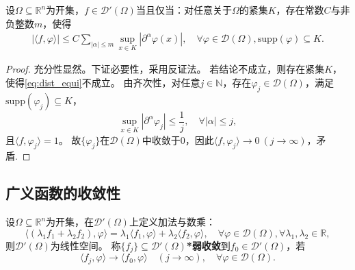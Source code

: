 \documentclass[../../main.tex]{subfiles}%
\begin{document}
\begin{theorem}
设$\Omega\subseteq\mathbb{R}^n$为开集，$f\in\mathscr{D}'(\Omega)$当且仅当：对任意关于$\Omega$的紧集$K$，存在常数$C$与非负整数$m$，使得
\begin{align}
|\langle f,\varphi\rangle|\leqslant C\sum\limits_{|\alpha|\leqslant m}\sup\limits_{x\in K}|\partial^\alpha\varphi(x)|,\quad\forall\varphi\in\mathscr{D}(\Omega),\mathrm{supp}(\varphi)\subseteq K.\label{eq:dist_equi}
\end{align}
\end{theorem}
\begin{proof}
充分性显然。下证必要性，采用反证法。
若结论不成立，则存在紧集$K$，使得\eqref{eq:dist_equi}不成立。
由齐次性，对任意$j\in\mathbb{N}$，存在$\varphi_j\in\mathscr{D}(\Omega)$，满足$\mathrm{supp}(\varphi_j)\subseteq K$，
$$\sup\limits_{x\in K}|\partial^\alpha\varphi_j|\leqslant\frac{1}{j},\quad\forall|\alpha|\leqslant j,$$
且$\langle f,\varphi_j\rangle=1$。
故$\{\varphi_j\}$在$\mathscr{D}(\Omega)$中收敛于0，因此$\langle f,\varphi_j\rangle\to0\ (j\to\infty)$，矛盾.
\end{proof}

\subsection{广义函数的收敛性}

\begin{definition}
设$\Omega\subseteq\mathbb{R}^n$为开集，在$\mathscr{D}'(\Omega)$上定义加法与数乘：
$$\langle(\lambda_1f_1+\lambda_2f_2),\varphi\rangle=\lambda_1\langle f_1,\varphi\rangle+\lambda_2\langle f_2,\varphi\rangle,\quad\forall\varphi\in\mathscr{D}(\Omega),\forall\lambda_1,\lambda_2\in\mathbb{R},$$
则$\mathscr{D}'(\Omega)$为线性空间。
称$\{f_j\}\subseteq\mathscr{D}'(\Omega)$\textbf{*弱收敛}到$f_0\in\mathscr{D}'(\Omega)$，若
$$\langle f_j,\varphi\rangle\to\langle f_0,\varphi\rangle\quad(j\to\infty),\quad\forall\varphi\in\mathscr{D}(\Omega).$$
\end{definition}
\end{document}
